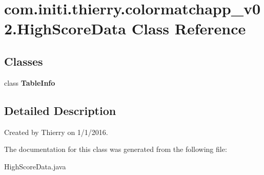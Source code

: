 \hypertarget{classcom_1_1initi_1_1thierry_1_1colormatchapp__v02_1_1_high_score_data}{}\section{com.\+initi.\+thierry.\+colormatchapp\+\_\+v02.\+High\+Score\+Data Class Reference}
\label{classcom_1_1initi_1_1thierry_1_1colormatchapp__v02_1_1_high_score_data}
\subsection*{Classes}
\begin{DoxyCompactItemize}
\item 
class {\bfseries Table\+Info}
\end{DoxyCompactItemize}


\subsection{Detailed Description}
Created by Thierry on 1/1/2016. 

The documentation for this class was generated from the following file\+:\begin{DoxyCompactItemize}
\item 
High\+Score\+Data.\+java\end{DoxyCompactItemize}
